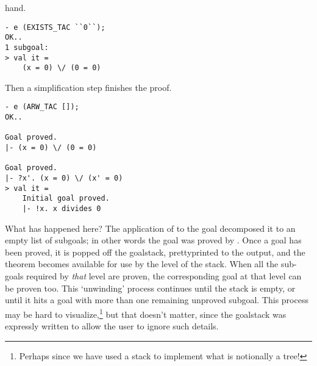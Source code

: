 hand.
\begin{session}\begin{verbatim}
- e (EXISTS_TAC ``0``);
OK..
1 subgoal:
> val it =
    (x = 0) \/ (0 = 0)
\end{verbatim}\end{session}
Then a simplification step finishes the proof.
\begin{session}\begin{verbatim}
- e (ARW_TAC []);
OK..

Goal proved.
|- (x = 0) \/ (0 = 0)

Goal proved.
|- ?x'. (x = 0) \/ (x' = 0)
> val it =
    Initial goal proved.
    |- !x. x divides 0
\end{verbatim}\end{session}
    What has happened here? The application of  to the
    goal decomposed it to an empty list of subgoals; in other words
    the goal was proved by .  Once a goal has been
    proved, it is popped off the goalstack, prettyprinted to the
    output, and the theorem becomes available for use by the level of
    the stack. When all the sub-goals required by {\it that\/} level
    are proven, the corresponding goal at that level can be proven
    too.  This `unwinding' process continues until the stack is empty,
    or until it hits a goal with more than one remaining unproved
    subgoal. This process may be hard to visualize,\footnote{Perhaps
      since we have used a stack to implement what is notionally a
      tree!} but that doesn't matter, since the goalstack was
    expressly written to allow the user to ignore such details.

